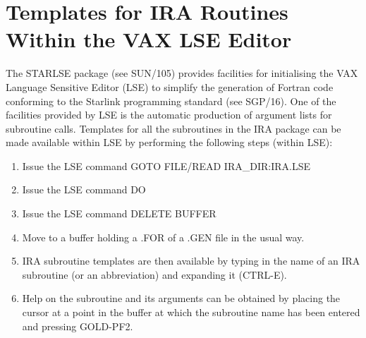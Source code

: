 \section {Templates for IRA Routines Within the VAX LSE Editor}
The STARLSE package (see SUN/105) provides facilities for initialising the VAX
Language Sensitive Editor (LSE) to simplify the generation of Fortran
code conforming to the Starlink programming standard (see SGP/16). One of the
facilities provided by LSE is the automatic production of argument lists for
subroutine calls. Templates for all the subroutines in the IRA package can be
made available within LSE by performing the following steps (within LSE):
\begin{enumerate}
\item Issue the LSE command GOTO FILE/READ IRA\_DIR:IRA.LSE
\item Issue the LSE command DO
\item Issue the LSE command DELETE BUFFER
\item Move to a buffer holding a .FOR of a .GEN file in the usual way.
\item IRA subroutine templates are then available by typing in the name of an
IRA subroutine (or an abbreviation) and expanding it (CTRL-E).
\item Help on the subroutine and its arguments can be obtained by placing the
cursor at a point in the buffer at which the subroutine name has been entered
and pressing GOLD-PF2.
\end{enumerate}

